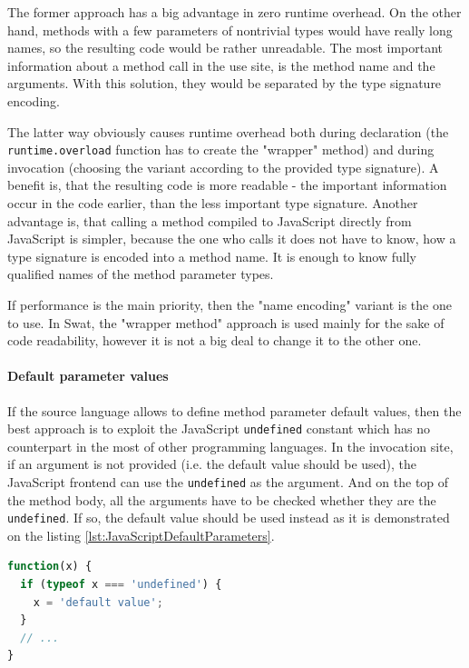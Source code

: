 \documentclass[12pt,a4paper]{report}
\begin{document}
The former approach has a big advantage in zero runtime overhead. On the other hand, methods with a few parameters of nontrivial types would have really long names, so the resulting code would be rather unreadable.
The most important information about a method call in the use site, is the method name and the arguments. With this solution, they would be separated by the type signature encoding.

The latter way obviously causes runtime overhead both during declaration (the \texttt{runtime.overload} function has to create the "wrapper" method) and during invocation (choosing the variant according to the provided type signature). A benefit is, that the resulting code is more readable - the important information occur in the code earlier, than the less important type signature. Another advantage is, that calling a method compiled to JavaScript directly from JavaScript is simpler, because the one who calls it does not have to know, how a type signature is encoded into a method name. It is enough to know fully qualified names of the method parameter types.

If performance is the main priority, then the "name encoding" variant is the one to use. In Swat, the "wrapper method" approach is used mainly for the sake of code readability, however it is not a big deal to change it to the other one.

\paragraph{Default parameter values} If the source language allows to define method parameter default values, then the best approach is to exploit the JavaScript \texttt{undefined} constant which has no counterpart in the most of other programming languages. In the invocation site, if an argument is not provided (i.e. the default value should be used), the JavaScript frontend can use the \texttt{undefined} as the argument. And on the top of the method body, all the arguments have to be checked whether they are the \texttt{undefined}. If so, the default value should be used instead as it is demonstrated on the listing \ref{lst:JavaScriptDefaultParameters}.

\begin{lstlisting}[language=JavaScript,frame=single,caption={Default parameters in JavaScript.},label={lst:JavaScriptDefaultParameters}]
function(x) {
  if (typeof x === 'undefined') {
    x = 'default value';	
  }
  // ...
}
\end{lstlisting}
\end{document}
